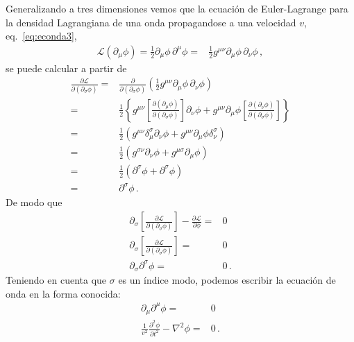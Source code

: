 Generalizando a tres dimensiones vemos que la ecuación de Euler-Lagrange para la densidad Lagrangiana de una onda propagandose a una velocidad $v$, eq.~\eqref{eq:econda3},
\begin{align}
  \mathcal{L}(\partial_{\mu} \phi)=  \frac{1}{2}{\partial_\mu\phi}\,{\partial^\mu\phi}
  =& \frac{1}{2}g^{\mu\nu}{\partial_\mu\phi}\,{\partial_{\nu}\phi}\,,
\end{align}
se puede calcular a partir de
\begin{align}
  \frac{\partial\mathcal{L}}{\partial(\partial_{\sigma}\phi)}=&
                                                                \frac{\partial}{\partial(\partial_{\sigma}\phi)} \left( \frac{1}{2}g^{\mu\nu}{\partial_\mu\phi}\,{\partial_{\nu}\phi} \right) \nonumber\\
    =&\frac{1}{2} \left\{  g^{\mu\nu}\left[ \frac{\partial \left( \partial_{\mu}\phi \right)}{\partial \left( \partial_{\sigma}\phi \right)} \right]\partial_{\nu}\phi
     +g^{\mu\nu} \partial_{\mu}\phi \left[ \frac{\partial \left( \partial_{\nu}\phi \right)}{\partial \left( \partial_{\sigma}\phi \right)} \right] \right\} \nonumber\\
    =&\frac{1}{2}\left(  g^{\mu\nu}\delta^{\sigma}_{\mu}\partial_{\nu}\phi
     +  g^{\mu\nu}\partial_{\mu}\phi \delta ^{\sigma}_{\nu}\right) \nonumber\\
    =&\frac{1}{2}\left(  g^{\sigma\nu}\partial_{\nu}\phi
       +  g^{\mu\sigma}\partial_{\mu}\phi \right) \nonumber\\
           =&\frac{1}{2}\left(  \partial^{\sigma}\phi
     + \partial^{\sigma}\phi \right) \nonumber\\
=& \partial^{\sigma}\phi\,.
\end{align}
De modo que
\begin{align}
   \partial_{\sigma} \left[ \frac{\partial\mathcal{L}}{\partial(\partial_{\sigma}\phi)}\right]-\frac{\partial\mathcal{L}}{\partial\phi}=&0 \nonumber\\
  \partial_{\sigma} \left[ \frac{\partial\mathcal{L}}{\partial(\partial_{\sigma}\phi)}\right]=&0 \nonumber\\
       \partial_{\sigma}\partial^{\sigma}\phi=&0 \,.
\end{align}
Teniendo en cuenta que $\sigma$ es un índice modo, podemos escribir la ecuación de onda en la forma conocida:
\begin{align}
     \partial_{\mu}\partial^{\mu}\phi=&0 \nonumber\\
     \frac{1}{v^2}\frac{\partial^2\phi}{\partial t^2}-\nabla^2\phi=&0\,.
\end{align}

